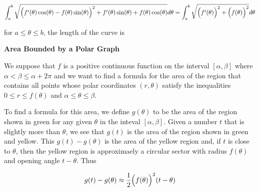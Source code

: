 $$\int_a^b\sqrt{\Bigl(f'(\theta)\cos(\theta)-f(\theta)\sin(\theta)\Bigr)^2+f'(\theta)\sin(\theta)+f(\theta)\cos(\theta)}d\theta=\int_a^b\sqrt{\Bigl(f'(\theta)\Bigr)^2+\Bigl(f(\theta)\Bigr)^2}d\theta$$

for $a\leq\theta\leq b$, the length of the curve is

\filbreak
\vskip 1cm
{\bf Area Bounded by a Polar Graph}

\vskip 1mm
We suppose that $f$ is a positive continuous function on the interval $[\alpha,\beta]$ where $\alpha<\beta\leq\alpha+2\pi$ and we want to find a formula for the area of the region that contains all points whose polar coordinates $(r,\theta)$ satisfy the inequalities $0\leq r\leq f(\theta)$ and $\alpha\leq\theta\leq\beta$.

\vskip 1mm
To find a formula for this area, we define $g(\theta)$ to be the area of the region shown in green for any given $\theta$ in the inteval $[\alpha,\beta]$. Given a number $t$ that is slightly more than $\theta$, we see that $g(t)$ is the area of the region shown in green and yellow. This $g(t)-g(\theta)$ is the area of the yellow region and, if $t$ is close to $\theta$, then the yellow region is approximaely a circular sector with radius $f(\theta)$ and opening angle $t-\theta$. Thus

$$g(t)-g(\theta)\approx {1\over 2}\Bigl(f(\theta)\Bigr)^2(t-\theta)$$

\filbreak
\vfill\eject
\bye
